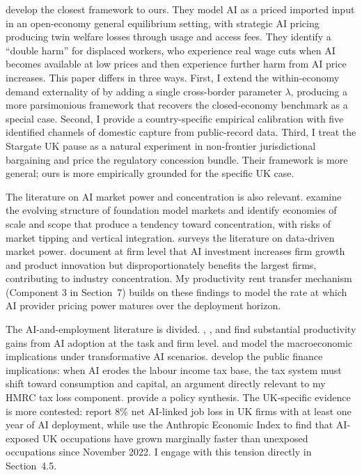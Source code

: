 \documentclass[11pt,letterpaper]{article}
\theoremstyle{remark}
\begin{document}
\citet{athey_scott_morton_2025} develop the closest framework to ours. They model {AI} as a priced imported input in an open-economy general equilibrium setting, with strategic {AI} pricing producing twin welfare losses through usage and access fees. They identify a ``double harm'' for displaced workers, who experience real wage cuts when {AI} becomes available at low prices and then experience further harm from {AI} price increases. This paper differs in three ways. First, I extend the within-economy demand externality of \citet{hemenway_falk_tsoukalas_2026} by adding a single cross-border parameter $\lambda$, producing a more parsimonious framework that recovers the closed-economy benchmark as a special case. Second, I provide a country-specific empirical calibration with five identified channels of domestic capture from public-record data. Third, I treat the Stargate {UK} pause as a natural experiment in non-frontier jurisdictional bargaining and price the regulatory concession bundle. Their framework is more general; ours is more empirically grounded for the specific {UK} case.

The literature on {AI} market power and concentration is also relevant. \citet{korinek_vipra_2025} examine the evolving structure of foundation model markets and identify economies of scale and scope that produce a tendency toward concentration, with risks of market tipping and vertical integration. \citet{gans_2024} surveys the literature on data-driven market power. \citet{babina_fedyk_he_hodson_2024} document at firm level that {AI} investment increases firm growth and product innovation but disproportionately benefits the largest firms, contributing to industry concentration. My productivity rent transfer mechanism (Component 3 in Section~7) builds on these findings to model the rate at which {AI} provider pricing power matures over the deployment horizon.

The {AI}-and-employment literature is divided. \citet{eloundou_2024}, \citet{brynjolfsson_li_raymond_2025}, and \citet{aghion_antonin_bunel_2024} find substantial productivity gains from {AI} adoption at the task and firm level. \citet{korinek_stiglitz_2019, korinek_stiglitz_2021} and \citet{korinek_suh_2024} model the macroeconomic implications under transformative {AI} scenarios. \citet{korinek_lockwood_2026} develop the public finance implications: when {AI} erodes the labour income tax base, the tax system must shift toward consumption and capital, an argument directly relevant to my HMRC tax loss component. \citet{furman_seamans_2024} provide a policy synthesis. The {UK}-specific evidence is more contested: \citet{morgan_stanley_2026} report 8\% net {AI}-linked job loss in {UK} firms with at least one year of {AI} deployment, while \citet{british_progress_2026} use the {Anthropic Economic Index} to find that {AI}-exposed {UK} occupations have grown marginally faster than unexposed occupations since November 2022. I engage with this tension directly in Section~4.5.
\end{document}
